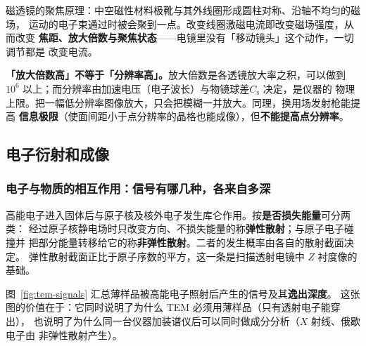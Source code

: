 \begin{principle}
磁透镜的聚焦原理：中空磁性材料极靴与其外线圈形成圆柱对称、沿轴不均匀的磁场，
运动的电子束通过时被会聚到一点。改变线圈激磁电流即改变磁场强度，从而改变
\textbf{焦距、放大倍数与聚焦状态}——电镜里没有「移动镜头」这个动作，一切调节都是
改变电流。
\end{principle}

\begin{pitfall}
\textbf{「放大倍数高」不等于「分辨率高」。}放大倍数是各透镜放大率之积，可以做到
$10^{6}$ 以上；而分辨率由加速电压（电子波长）与物镜球差$C_{\mathrm{s}}$ 决定，是仪器的
物理上限。把一幅低分辨率图像放大，只会把模糊一并放大。同理，换用场发射枪能提高
\textbf{信息极限}（使面间距小于点分辨率的晶格也能成像），但\textbf{不能提高点分辨率}。
\end{pitfall}

\subsection{电子衍射和成像}

\subsubsection{电子与物质的相互作用：信号有哪几种，各来自多深}

高能电子进入固体后与原子核及核外电子发生库仑作用。按\textbf{是否损失能量}可分两类：
经过原子核静电场时只改变方向、不损失能量的称\textbf{弹性散射}；与原子电子碰撞并
把部分能量转移给它的称\textbf{非弹性散射}。二者的发生概率由各自的散射截面决定。
弹性散射截面正比于原子序数的平方，这一条是扫描透射电镜中 $Z$ 衬度像的基础。

图~\ref{fig:tem-signals} 汇总薄样品被高能电子照射后产生的信号及其\textbf{逸出深度}。
这张图的价值在于：它同时说明了为什么 TEM 必须用薄样品（只有透射电子能穿出），
也说明了为什么同一台仪器加装谱仪后可以同时做成分分析（$X$ 射线、俄歇电子由
非弹性散射产生）。

